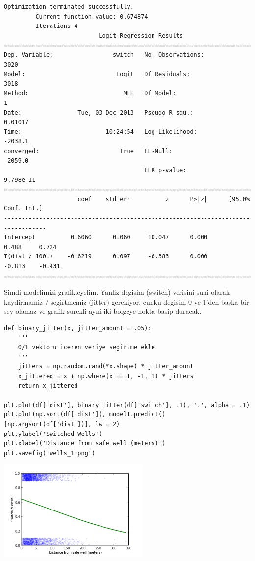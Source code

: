 \documentclass[12pt,fleqn]{article}\usepackage{../common}
\begin{document}
\begin{verbatim}
Optimization terminated successfully.
         Current function value: 0.674874
         Iterations 4
                           Logit Regression Results                           
==============================================================================
Dep. Variable:                 switch   No. Observations:                 3020
Model:                          Logit   Df Residuals:                     3018
Method:                           MLE   Df Model:                            1
Date:                Tue, 03 Dec 2013   Pseudo R-squ.:                 0.01017
Time:                        10:24:54   Log-Likelihood:                -2038.1
converged:                       True   LL-Null:                       -2059.0
                                        LLR p-value:                 9.798e-11
==================================================================================
                     coef    std err          z      P>|z|      [95.0% Conf. Int.]
----------------------------------------------------------------------------------
Intercept          0.6060      0.060     10.047      0.000         0.488     0.724
I(dist / 100.)    -0.6219      0.097     -6.383      0.000        -0.813    -0.431
==================================================================================
\end{verbatim}

Simdi modelimizi grafikleyelim. Yanliz degisim (switch) verisini suni olarak
kaydirmamiz / segirtmemiz (jitter) gerekiyor, cunku degisim 0 ve 1'den baska
bir sey olamaz ve grafik surekli ayni iki bolgeye nokta basip duracak. 

\begin{verbatim}
def binary_jitter(x, jitter_amount = .05):
    '''
    0/1 vektoru iceren veriye segirtme ekle
    '''
    jitters = np.random.rand(*x.shape) * jitter_amount
    x_jittered = x + np.where(x == 1, -1, 1) * jitters
    return x_jittered

plt.plot(df['dist'], binary_jitter(df['switch'], .1), '.', alpha = .1)
plt.plot(np.sort(df['dist']), model1.predict()[np.argsort(df['dist'])], lw = 2)
plt.ylabel('Switched Wells')
plt.xlabel('Distance from safe well (meters)')
plt.savefig('wells_1.png')
\end{verbatim}

\includegraphics[height=5cm]{wells_1.png}
\end{document}

